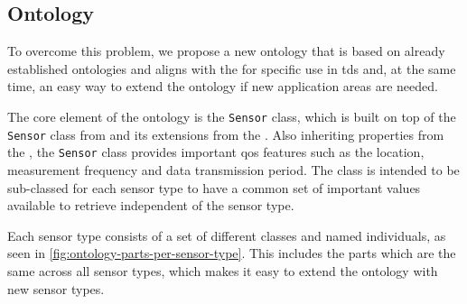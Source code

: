 \subsection{Ontology}\label{sec:ontology}

To overcome this problem, we propose a new ontology that is based on already established ontologies and aligns with the  for specific use in \glspl{td} and, at the same time, an easy way to extend the ontology if new application areas are needed.

The core element of the ontology is the \lstinline|Sensor| class, which is built on top of the \lstinline|Sensor| class from  and its extensions from the . Also inheriting properties from the , the \lstinline|Sensor| class provides important \gls{qos} features such as the location, measurement frequency and data transmission period. The class is intended to be sub-classed for each sensor type to have a common set of important values available to retrieve independent of the sensor type.

Each sensor type consists of a set of different classes and named individuals, as seen in \autoref{fig:ontology-parts-per-sensor-type}. This includes the parts which are the same across all sensor types, which makes it easy to extend the ontology with new sensor types.

